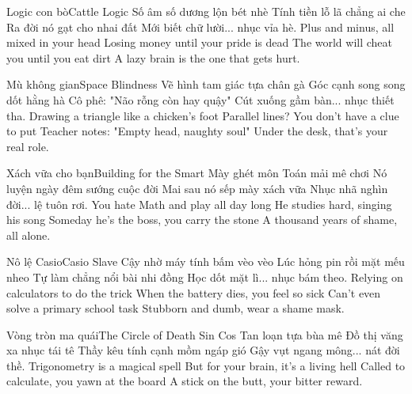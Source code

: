 \begin{tutuyetbox}{Logic con bò}{Cattle Logic}
Số âm số dương lộn bét nhè
Tính tiền lỗ lã chẳng ai che
Ra đời nó gạt cho nhai đất
Mới biết chữ lười... nhục vỉa hè.
\tcblower
Plus and minus, all mixed in your head
Losing money until your pride is dead
The world will cheat you until you eat dirt
A lazy brain is the one that gets hurt.
\end{tutuyetbox}

\begin{tutuyetbox}{Mù không gian}{Space Blindness}
Vẽ hình tam giác tựa chân gà
Góc cạnh song song dốt hằng hà
Cô phê: "Não rỗng còn hay quậy"
Cút xuống gầm bàn... nhục thiết tha.
\tcblower
Drawing a triangle like a chicken's foot
Parallel lines? You don't have a clue to put
Teacher notes: "Empty head, naughty soul"
Under the desk, that's your real role.
\end{tutuyetbox}

\begin{tutuyetbox}{Xách vữa cho bạn}{Building for the Smart}
Mày ghét môn Toán mải mê chơi
Nó luyện ngày đêm sướng cuộc đời
Mai sau nó sếp mày xách vữa
Nhục nhã nghìn đời... lệ tuôn rơi.
\tcblower
You hate Math and play all day long
He studies hard, singing his song
Someday he's the boss, you carry the stone
A thousand years of shame, all alone.
\end{tutuyetbox}

\begin{tutuyetbox}{Nô lệ Casio}{Casio Slave}
Cậy nhờ máy tính bấm vèo vèo
Lúc hỏng pin rồi mặt mếu nheo
Tự làm chẳng nổi bài nhi đồng
Học dốt mặt lì... nhục bám theo.
\tcblower
Relying on calculators to do the trick
When the battery dies, you feel so sick
Can't even solve a primary school task
Stubborn and dumb, wear a shame mask.
\end{tutuyetbox}

\begin{tutuyetbox}{Vòng tròn ma quái}{The Circle of Death}
Sin Cos Tan loạn tựa bùa mê
Đồ thị văng xa nhục tái tê
Thầy kêu tính cạnh mồm ngáp gió
Gậy vụt ngang mông... nát đời thề.
\tcblower
Trigonometry is a magical spell
But for your brain, it's a living hell
Called to calculate, you yawn at the board
A stick on the butt, your bitter reward.
\end{tutuyetbox}

